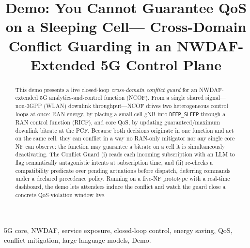 \documentclass[conference]{IEEEtran}
\begin{document}
\title{Demo: You Cannot Guarantee QoS on a Sleeping Cell---%
Cross-Domain Conflict Guarding in an NWDAF-Extended 5G Control Plane}

\author{
}

\maketitle

\begin{abstract}
This demo presents a live closed-loop \emph{cross-domain conflict guard} for an
NWDAF-extended 5G analytics-and-control function (NCOF). From a single shared
signal---non-3GPP (WLAN) downlink throughput---NCOF drives two heterogeneous
control loops at once: RAN energy, by placing a small-cell gNB into
\texttt{DEEP\_SLEEP} through a RAN control function (RICF), and core QoS, by
updating guaranteed/maximum downlink bitrate at the PCF. Because both decisions
originate in one function and act on the same cell, they can conflict in a way
no RAN-only mitigator nor any single core NF can observe: the function may
guarantee a bitrate on a cell it is simultaneously deactivating. The Conflict
Guard (i) reads each incoming subscription with an LLM to flag semantically
antagonistic intents at subscription time, and (ii) re-checks a compatibility
predicate over pending actuations before dispatch, deferring commands under a
declared precedence policy. Running on a five-NF prototype with a real-time
dashboard, the demo lets attendees induce the conflict and watch the guard
close a concrete QoS-violation window live.
\end{abstract}

\begin{IEEEkeywords}
5G core, NWDAF, service exposure, closed-loop control, energy saving, QoS,
conflict mitigation, large language models, Demo.
\end{IEEEkeywords}
\end{document}
